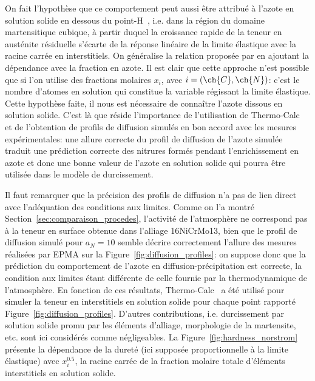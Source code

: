 On fait l'hypothèse que ce comportement peut aussi être attribué à l'azote en solution solide en dessous du point-H~\cite{Sherby2008}, i.e. dans la région du domaine martensitique cubique, à partir duquel la croissance rapide de la teneur en austénite résiduelle s'écarte de la réponse linéaire de la limite élastique avec la racine carrée en interstitiels. On généralise la relation proposée par \citet{Cohen1968,Norstrom1976} en ajoutant la dépendance avec la fraction en azote. Il est clair que cette approche n'est possible que si l'on utilise des fractions molaires $x_{i}$, avec $i = (\ch{C},\ch{N})$: c'est le nombre d'atomes en solution qui constitue la variable régissant la limite élastique. Cette hypothèse faite, il nous est nécessaire de connaître l'azote dissous en solution solide. C'est là que réside l'importance de l'utilisation de Thermo-Calc~\cite{Andersson2002,Borgenstam2000} et de l'obtention de profils de diffusion simulés en bon accord avec les mesures expérimentales: une allure \og{}correcte\fg{} du profil de diffusion de l'azote simulée traduit une prédiction \og{}correcte\fg{} des nitrures formés pendant l'enrichissement en azote et donc une bonne valeur de l'azote en solution solide qui pourra être utilisée dans le modèle de durcissement. 

Il faut remarquer que la précision des profils de diffusion n'a pas de lien direct avec l'adéquation des conditions aux limites. Comme on l'a montré Section~\ref{sec:comparaison_procedes}, l'activité de l'atmosphère ne correspond pas à la teneur en surface obtenue dans l'alliage 16NiCrMo13, bien que le profil de diffusion simulé pour $a_{N}=10$ semble décrire correctement l'allure des mesures réalisées par EPMA sur la Figure~\ref{fig:diffusion_profiles}: on suppose donc que la prédiction du comportement de l'azote en diffusion-précipitation est correcte, la condition aux limites étant différente de celle fournie par la thermodynamique de l'atmosphère. En fonction de ces résultats, Thermo-Calc~\cite{Andersson2002,Borgenstam2000} a été utilisé pour simuler la teneur en interstitiels en solution solide pour chaque point rapporté Figure~\ref{fig:diffusion_profiles}. D'autres contributions, i.e. durcissement par solution solide promu par les éléments d'alliage, morphologie de la martensite, etc. sont ici considérés comme négligeables. La Figure~\ref{fig:hardness_norstrom} présente la dépendance de la dureté (ici supposée proportionnelle à la limite élastique) avec $x_{i}^{0.5}$, la racine carrée de la fraction molaire totale d'éléments interstitiels en solution solide. 

